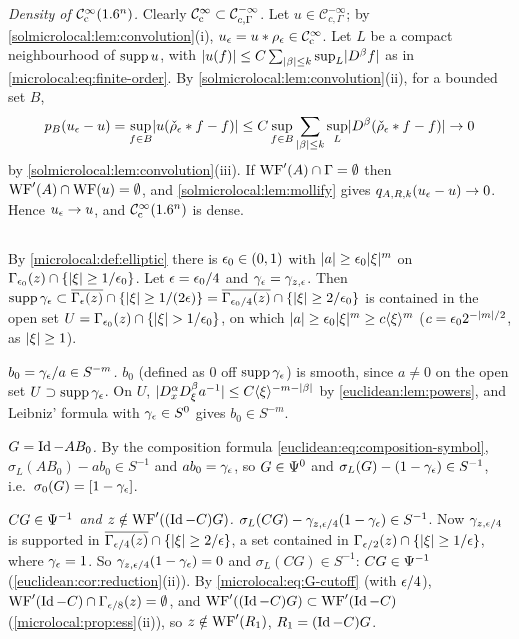 \emph{Density of $\mathcal{C}^\infty_{\mathrm{c}}(1.6^n)$.} Clearly $\mathcal{C}^\infty_{\mathrm{c}}\subset\mathcal C^{-\infty}_{c,\Gamma}$. Let
$u\in\mathcal C^{-\infty}_{c,\Gamma}$; by \cref{solmicrolocal:lem:convolution}(i),
$u_\epsilon=u*\rho_\epsilon\in\mathcal{C}^\infty_{\mathrm{c}}$. Let $L$ be a compact neighbourhood of $\operatorname{supp} u$, with
$\lvert u(f)\rvert\le C\sum_{\lvert \beta\rvert\le k}\sup_L\lvert D^\beta f\rvert$ as in
\eqref{microlocal:eq:finite-order}. By \cref{solmicrolocal:lem:convolution}(ii),
for a bounded set $B$,
\begin{equation*}
  p_B(u_\epsilon-u)=\sup_{f\in B}\lvert u(\check\rho_\epsilon*f-f)\rvert
  \le C\sup_{f\in B}\sum_{\lvert \beta\rvert\le k}\sup_L\lvert D^\beta(\check\rho_\epsilon*f-f)\rvert\to0
\end{equation*}
by \cref{solmicrolocal:lem:convolution}(iii). If $\operatorname{WF}'(A)\cap\Gamma=\emptyset$ then
$\operatorname{WF}'(A)\cap\operatorname{WF}(u)=\emptyset$, and \cref{solmicrolocal:lem:mollify} gives
$q_{A,R,k}(u_\epsilon-u)\to0$. Hence $u_\epsilon\to u$, and $\mathcal{C}^\infty_{\mathrm{c}}(1.6^n)$ is dense.

\subsection*{}
By \cref{microlocal:def:elliptic} there is $\epsilon_0\in(0,1)$ with $\lvert a\rvert\ge\epsilon_0\lvert \xi\rvert^m$ on
$\Gamma_{\epsilon_0}(z)\cap\{\lvert \xi\rvert\ge1/\epsilon_0\}$. Let $\epsilon=\epsilon_0/4$ and $\gamma_\epsilon=\gamma_{z,\epsilon}$.
Then $\operatorname{supp}\gamma_\epsilon\subset\overline{\Gamma_\epsilon(z)}\cap\{\lvert \xi\rvert\ge1/(2\epsilon)\}=\overline{\Gamma_{\epsilon_0/4}(z)}\cap
\{\lvert \xi\rvert\ge2/\epsilon_0\}$ is contained in the
open set $U=\Gamma_{\epsilon_0}(z)\cap\{\lvert \xi\rvert>1/\epsilon_0\}$, on which $\lvert a\rvert\ge\epsilon_0\lvert \xi\rvert^m\ge c\langle \xi\rangle^m$
($c=\epsilon_0 2^{-\lvert m\rvert/2}$, as $\lvert \xi\rvert\ge1$).

\emph{$b_0=\gamma_\epsilon/a\in S^{-m}$.} $b_0$ (defined as $0$ off $\operatorname{supp}\gamma_\epsilon$) is smooth, since
$a\ne0$ on the open set $U\supset\operatorname{supp}\gamma_\epsilon$. On $U$, $\lvert D^\alpha_xD^\beta_\xi a^{-1}\rvert\le
C\langle \xi\rangle^{-m-\lvert \beta\rvert}$ by \cref{euclidean:lem:powers}, and Leibniz' formula with
$\gamma_\epsilon\in S^0$ gives $b_0\in S^{-m}$.

\emph{$G=\operatorname{Id}-AB_0$.} By the composition formula \eqref{euclidean:eq:composition-symbol},
$\sigma_L(AB_0)-ab_0\in S^{-1}$ and $ab_0=\gamma_\epsilon$, so $G\in\Psi^{0}$ and
$\sigma_L(G)-(1-\gamma_\epsilon)\in S^{-1}$, i.e.\ $\sigma_0(G)=[1-\gamma_\epsilon]$.

\emph{$CG\in\Psi^{-1}$ and $z\notin\operatorname{WF}'((\operatorname{Id}-C)G)$.} $\sigma_L(CG)-\gamma_{z,\epsilon/4}(1-\gamma_\epsilon)\in S^{-1}$.
Now $\gamma_{z,\epsilon/4}$ is supported in $\overline{\Gamma_{\epsilon/4}(z)}\cap\{\lvert \xi\rvert\ge2/\epsilon\}$, a set
contained in $\Gamma_{\epsilon/2}(z)\cap\{\lvert \xi\rvert\ge1/\epsilon\}$, where $\gamma_\epsilon=1$. So
$\gamma_{z,\epsilon/4}(1-\gamma_\epsilon)=0$ and $\sigma_L(CG)\in S^{-1}$: $CG\in\Psi^{-1}$
(\cref{euclidean:cor:reduction}(ii)). By \eqref{microlocal:eq:G-cutoff} (with $\epsilon/4$),
$\operatorname{WF}'(\operatorname{Id}-C)\cap\Gamma_{\epsilon/8}(z)=\emptyset$, and $\operatorname{WF}'((\operatorname{Id}-C)G)\subset\operatorname{WF}'(\operatorname{Id}-C)$
(\cref{microlocal:prop:ess}(ii)), so $z\notin\operatorname{WF}'(R_1)$, $R_1=(\operatorname{Id}-C)G$.

